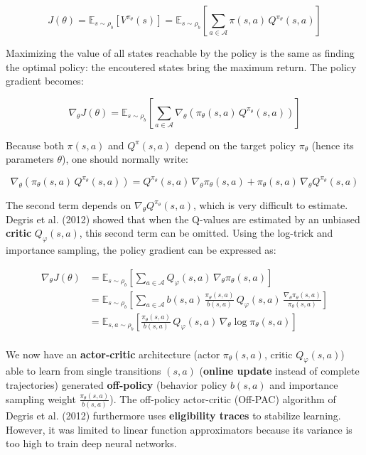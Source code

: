 \documentclass[
  letterpaper,
  DIV=11,
  numbers=noendperiod]{scrreprt}
\begin{document}
\[
    J(\theta) = \mathbb{E}_{s \sim \rho_b} [V^{\pi_\theta}(s)] = \mathbb{E}_{s \sim \rho_b} [\sum_{a\in\mathcal{A}} \pi(s, a) \, Q^{\pi_\theta}(s, a)]
\]

Maximizing the value of all states reachable by the policy is the same
as finding the optimal policy: the encoutered states bring the maximum
return. The policy gradient becomes:

\[
    \nabla_\theta J(\theta) = \mathbb{E}_{s \sim \rho_b} [\sum_{a\in\mathcal{A}} \nabla_\theta  (\pi_\theta(s, a) \, Q^{\pi_\theta}(s, a))]
\]

Because both \(\pi(s, a)\) and \(Q^\pi(s, a)\) depend on the target
policy \(\pi_\theta\) (hence its parameters \(\theta\)), one should
normally write:

\[
    \nabla_\theta  (\pi_\theta(s, a) \, Q^{\pi_\theta}(s, a)) = Q^{\pi_\theta}(s, a) \, \nabla_\theta  \pi_\theta(s, a) + \pi_\theta(s, a) \, \nabla_\theta Q^{\pi_\theta}(s, a)
\]

The second term depends on \(\nabla_\theta Q^{\pi_\theta}(s, a)\), which
is very difficult to estimate. Degris et al. (2012) showed that when the
Q-values are estimated by an unbiased \textbf{critic}
\(Q_\varphi(s, a)\), this second term can be omitted. Using the
log-trick and importance sampling, the policy gradient can be expressed
as:

\[
\begin{aligned}
    \nabla_\theta J(\theta) & = \mathbb{E}_{s \sim \rho_b} [\sum_{a\in\mathcal{A}} Q_\varphi(s, a) \, \nabla_\theta \pi_\theta(s, a)] \\
                            & = \mathbb{E}_{s \sim \rho_b} [\sum_{a\in\mathcal{A}} b(s, a) \, \frac{\pi_\theta(s, a)}{b(s, a)} \, Q_\varphi(s, a) \, \frac{\nabla_\theta \pi_\theta(s, a)}{\pi_\theta(s, a)}] \\
                            & = \mathbb{E}_{s,a \sim \rho_b} [\frac{\pi_\theta(s, a)}{b(s, a)} \, Q_\varphi(s, a) \, \nabla_\theta \log \pi_\theta(s, a)] \\
\end{aligned}
\]

We now have an \textbf{actor-critic} architecture (actor
\(\pi_\theta(s, a)\), critic \(Q_\varphi(s, a)\)) able to learn from
single transitions \((s,a)\) (\textbf{online update} instead of complete
trajectories) generated \textbf{off-policy} (behavior policy \(b(s,a)\)
and importance sampling weight \(\frac{\pi_\theta(s, a)}{b(s, a)}\)).
The off-policy actor-critic (Off-PAC) algorithm of Degris et al. (2012)
furthermore uses \textbf{eligibility traces} to stabilize learning.
However, it was limited to linear function approximators because its
variance is too high to train deep neural networks.
\end{document}
